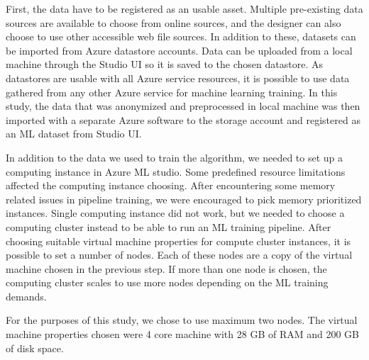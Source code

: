 First,
the data have to be registered as an usable asset.
Multiple pre-existing data sources are available to choose
from online sources,
and the designer can also choose to use
other accessible web file sources.
In addition to these,
datasets can be imported from Azure datastore accounts.
Data can be uploaded from a local machine through the Studio UI
so it is saved to the chosen datastore.
As datastores are usable with all Azure service resources,
it is possible to use data gathered from any other Azure service
for machine learning training.
In this study,
the data that was anonymized and preprocessed in local machine
was then imported with a separate Azure software to the storage account
and registered as an ML dataset from Studio UI.

In addition to the data we used to train the algorithm,
we needed to set up a computing instance
in Azure ML studio.
Some predefined resource limitations
affected the computing instance choosing.
After encountering some memory related issues in pipeline training,
we were encouraged to pick memory prioritized instances.
Single computing instance did not work,
but we needed to choose a computing cluster instead
to be able to run an ML training pipeline.
After choosing suitable virtual machine properties for compute cluster instances,
it is possible to set a number of nodes.
Each of these nodes are a copy of the virtual machine
chosen in the previous step.
If more than one node is chosen,
the computing cluster scales to use more nodes
depending on the ML training demands.

For the purposes of this study,
we chose to use maximum two nodes.
The virtual machine properties chosen
were 4 core machine with 28 GB of RAM and 200 GB of disk space.


\clearpage